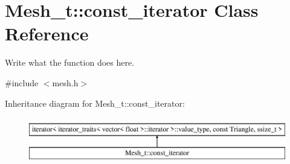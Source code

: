 \hypertarget{classMesh__t_1_1const__iterator}{\section{Mesh\+\_\+t\+:\+:const\+\_\+iterator Class Reference}
\label{classMesh__t_1_1const__iterator}
}


Write what the function does here.  




{\ttfamily \#include $<$mesh.\+h$>$}

Inheritance diagram for Mesh\+\_\+t\+:\+:const\+\_\+iterator\+:\begin{figure}[H]
\begin{center}
\leavevmode
\includegraphics[height=2.000000cm]{classMesh__t_1_1const__iterator}
\end{center}
\end{figure}
